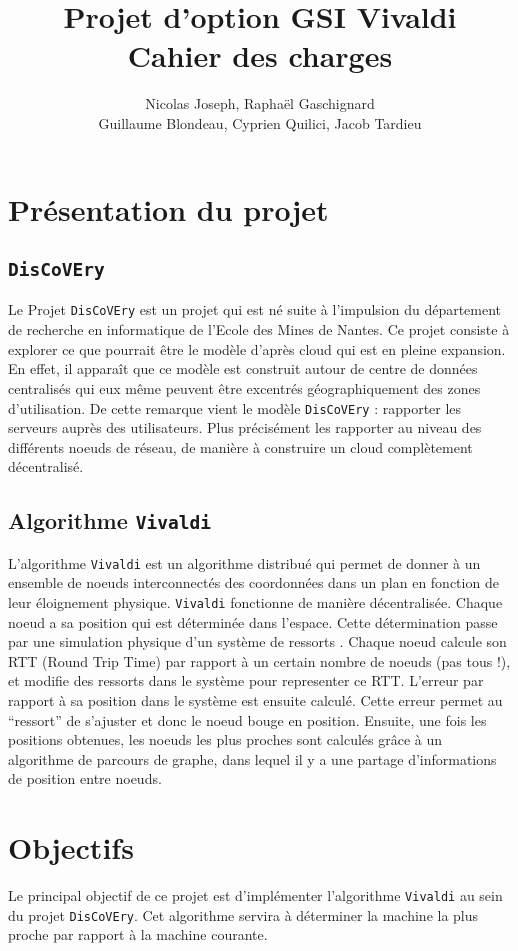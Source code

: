 \documentclass[11pt,a4paper]{article}
\title{Projet d'option GSI Vivaldi \\ Cahier des charges}
\author{Nicolas Joseph, Raphaël Gaschignard\\ Guillaume Blondeau, Cyprien Quilici, Jacob Tardieu}
\begin{document}
\maketitle
\section{Présentation du projet}
\subsection{\texttt{DisCoVEry}}

Le Projet \texttt{DisCoVEry} est un projet qui est né suite à l’impulsion du département de recherche en informatique de l'Ecole des Mines de Nantes. Ce projet consiste à explorer ce que pourrait être le modèle d’après cloud qui est en pleine expansion. En effet, il apparaît que ce modèle est construit autour de centre de données centralisés qui eux même peuvent être excentrés géographiquement des zones d’utilisation. De cette remarque vient  le modèle \texttt{DisCoVEry} : rapporter les serveurs auprès des utilisateurs. Plus précisément les rapporter au niveau des différents noeuds de réseau, de manière à construire un cloud complètement décentralisé.

\subsection{Algorithme \texttt{Vivaldi}}
L'algorithme \texttt{Vivaldi} \cite{vivaldi} est un algorithme distribué qui permet  de donner à un ensemble de noeuds interconnectés des coordonnées dans un plan en fonction de leur éloignement physique.
\texttt{Vivaldi} fonctionne de manière décentralisée. Chaque noeud a sa position qui est déterminée dans l’espace. Cette détermination passe par une simulation physique d’un système de ressorts . Chaque noeud calcule son RTT (Round Trip Time) par rapport à un certain nombre de noeuds (pas tous !), et modifie des ressorts dans le système pour representer ce RTT. L’erreur par rapport à sa position dans le système est ensuite calculé. Cette erreur permet au “ressort” de s’ajuster et donc le noeud bouge en position.
Ensuite, une fois les positions obtenues, les noeuds les plus proches sont calculés grâce à un algorithme de parcours de graphe, dans lequel il y a une partage d'informations de position entre noeuds.

\section{Objectifs}
Le principal objectif de ce projet est d'implémenter l'algorithme \texttt{Vivaldi} au sein du projet \texttt{DisCoVEry}. Cet algorithme servira à déterminer la machine la plus proche par rapport à la machine courante.\\
\end{document}
